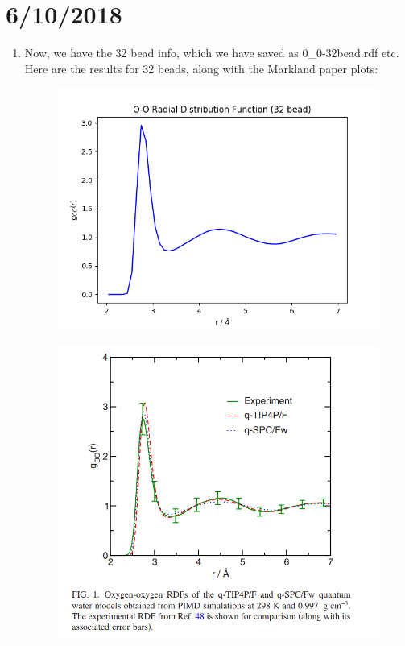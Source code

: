 \documentclass[12pt,reqno]{amsart}
\numberwithin{equation}{section}
\begin{document}
\section{6/10/2018}
\begin{enumerate}
\item Now, we have the 32 bead info, which we have saved as 0\_0-32bead.rdf etc.  Here are the results for 32 beads, along with the Markland paper plots:

\begin{figure}[H]
\centering
\includegraphics[scale=0.6]{0_0-32bead-tip4pF.png}
\end{figure}

\begin{figure}[H]
\centering
\includegraphics[scale=0.6]{Markland-0_0-RDF}
\end{figure}


\end{enumerate}
\end{document}
